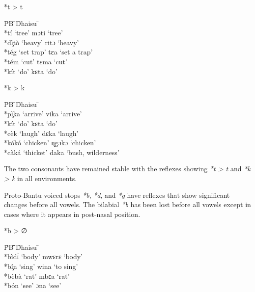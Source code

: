 \documentclass[output=paper,colorlinks,citecolor=brown]{langscibook}
\begin{document}
\ea%
    \label{ex:ngonyani:4}
    *t > t\\
    \begin{tabbing} 
        \= PB \quad\= \quad\= \quad\= \quad\= \quad\= \quad\= \quad\= Dhaisu \quad\=  \quad\= \\
        \>  *tí\>  ‘tree’ \> \> \>  \> \> \>  mɔti \>  ‘tree’\\
        \> *dì̧tò\> ‘heavy’ \> \> \>  \> \> \>  ritɔ \>  ‘heavy’\\
        \>  *tég \> ‘set trap’ \> \> \>  \> \> \>  tɛa \>  ‘set a trap’\\
        \>  *tém \>  ‘cut’ \> \> \>  \> \> \>  tɛma \>  ‘cut’ \\
        \> *kít \> ‘do’ \> \> \>  \> \> \> kɛta \> ‘do’    
    \end{tabbing}
\z

\ea%
    \label{ex:ngonyani:5}
    *k > k\\
    \begin{tabbing} 
        \= PB \quad\= \quad\= \quad\= \quad\= \quad\= \quad\= \quad\= Dhaisu \quad\=  \quad\= \\
        \> *pì̧ka \> ‘arrive’ \> \> \>  \> \> \> vika \> ‘arrive’\\
        \> *kít \> ‘do’ \> \> \>  \> \> \> kɛta \> ‘do’\\
        \> *cèk \> ‘laugh’ \> \> \>  \> \> \> dɛka \> ‘laugh’\\
        \> *kókó \> ‘chicken’ \> \> \>  \> \> \> ɳgɔkɔ \> ‘chicken’\\
        \> *càká \> ‘thicket’\> \> \>  \> \> \> daka \> ‘bush, wilderness’
    \end{tabbing}
\z

The two consonants have remained stable with the reflexes showing \textit{*t > t }and \textit{*k > k } in  all  environments.

Proto-Bantu voiced stops \textit{*b}, \textit{*d}, and \textit{*g} have reflexes that show significant changes before all vowels. The bilabial \textit{*b} has been lost before all vowels except in cases where it appears in post-nasal position.

\ea%
    \label{ex:ngonyani:6}
    *b > ∅\\
    \begin{tabbing} 
        \= PB \quad\= \quad\= \quad\= \quad\= \quad\= \quad\= \quad\= Dhaisu \quad\=  \quad\= \\
        \> *bìdɪ̀
        \> ‘body’
        \> \> \>  \> \> \> mwɛrɛ
        \> ‘body’\\
        \> *bí̧n
        \> ‘sing’
        \> \> \>  \> \> \> wina
        \> ‘to sing’\\
        \> *bèbà
        \> ‘rat’
        \> \> \>  \> \> \> mbɛa
        \> ‘rat’\\
        \> *bón
        \> ‘see’
        \> \> \>  \> \> \>  ɔna
        \> ‘see’
    \end{tabbing}
\z
\end{document}
